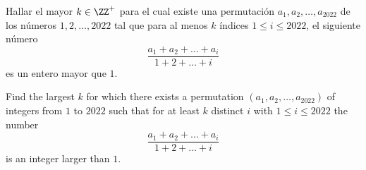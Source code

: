 %
%


\begin{probEG}
  Hallar el mayor $k\in\ZZ^+$ para el cual existe una permutación
  $a_1,a_2,\dots,a_{2022}$ de los números $1,2,\dots,2022$ tal que para al menos
  $k$ índices $1\le i\le 2022$, el siguiente número
  \[\frac{a_1+a_2+\dots+a_i}{1+2+\dots+i}\]
  es un entero mayor que $1$.
  \begin{hint}
    Find the largest $k$ for which there exists a permutation
    $(a_1,a_2,\dots,a_{2022})$ of integers from $1$ to $2022$ such that for at
    least $k$ distinct $i$ with $1\le i\le 2022$ the number
    \[\frac{a_1+a_2+\dots+a_i}{1+2+\dots+i}\]
    is an integer larger than $1$.
  \end{hint}
\end{probEG}

